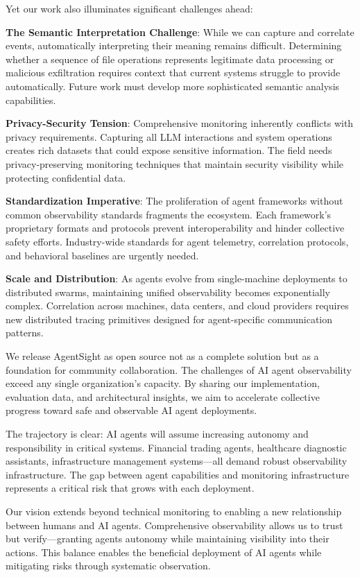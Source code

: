 \documentclass[sigplan,screen，review,9pt]{acmart}
\begin{document}
Yet our work also illuminates significant challenges ahead:

\textbf{The Semantic Interpretation Challenge}: While we can capture and correlate events, automatically interpreting their meaning remains difficult. Determining whether a sequence of file operations represents legitimate data processing or malicious exfiltration requires context that current systems struggle to provide automatically. Future work must develop more sophisticated semantic analysis capabilities.

\textbf{Privacy-Security Tension}: Comprehensive monitoring inherently conflicts with privacy requirements. Capturing all LLM interactions and system operations creates rich datasets that could expose sensitive information. The field needs privacy-preserving monitoring techniques that maintain security visibility while protecting confidential data.

\textbf{Standardization Imperative}: The proliferation of agent frameworks without common observability standards fragments the ecosystem. Each framework's proprietary formats and protocols prevent interoperability and hinder collective safety efforts. Industry-wide standards for agent telemetry, correlation protocols, and behavioral baselines are urgently needed.

\textbf{Scale and Distribution}: As agents evolve from single-machine deployments to distributed swarms, maintaining unified observability becomes exponentially complex. Correlation across machines, data centers, and cloud providers requires new distributed tracing primitives designed for agent-specific communication patterns.

We release AgentSight as open source not as a complete solution but as a foundation for community collaboration. The challenges of AI agent observability exceed any single organization's capacity. By sharing our implementation, evaluation data, and architectural insights, we aim to accelerate collective progress toward safe and observable AI agent deployments.

The trajectory is clear: AI agents will assume increasing autonomy and responsibility in critical systems. Financial trading agents, healthcare diagnostic assistants, infrastructure management systems—all demand robust observability infrastructure. The gap between agent capabilities and monitoring infrastructure represents a critical risk that grows with each deployment.

Our vision extends beyond technical monitoring to enabling a new relationship between humans and AI agents. Comprehensive observability allows us to trust but verify—granting agents autonomy while maintaining visibility into their actions. This balance enables the beneficial deployment of AI agents while mitigating risks through systematic observation.
\end{document}
